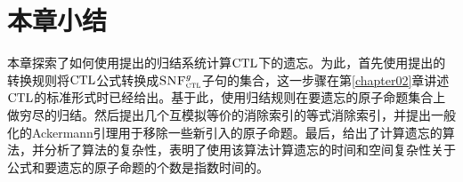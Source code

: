 \section{本章小结}\label{chapter04-conclusion}

本章探索了如何使用\citeauthor{zhang2014resolution}提出的归结系统计算$\textrm{CTL}$下的遗忘。为此，首先使用\citeauthor{zhang2014resolution}提出的转换规则将$\textrm{CTL}$公式转换成${\textsc{SNF}_{\textsc{ctl}}^g}$子句的集合，这一步骤在第\ref{chapter02}章讲述$\textrm{CTL}$的标准形式时已经给出。基于此，使用归结规则在要遗忘的原子命题集合上做穷尽的归结。然后提出几个互模拟等价的消除索引的等式消除索引，并提出一般化的Ackermann引理用于移除一些新引入的原子命题。最后，给出了计算遗忘的算法，并分析了算法的复杂性，表明了使用该算法计算遗忘的时间和空间复杂性关于公式和要遗忘的原子命题的个数是指数时间的。

